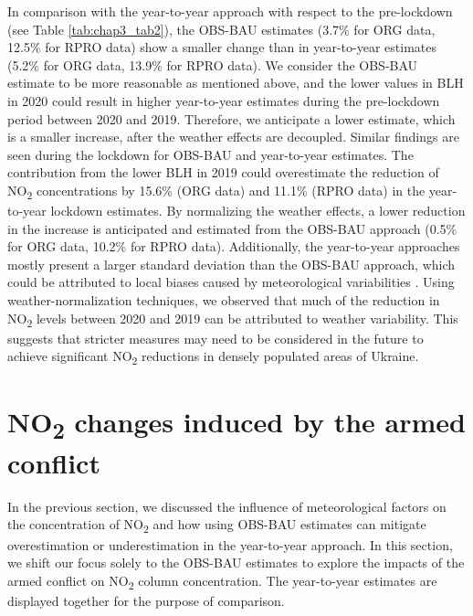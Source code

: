 In comparison with the year-to-year approach with respect to the pre-lockdown (see Table \ref{tab:chap3_tab2}), the OBS-BAU estimates (3.7\% for ORG data, 12.5\% for RPRO data) show a smaller change than in year-to-year estimates (5.2\% for ORG data, 13.9\% for RPRO data). We consider the OBS-BAU estimate to be more reasonable as mentioned above, and the lower values in BLH in 2020 could result in higher year-to-year estimates during the pre-lockdown period between 2020 and 2019. Therefore, we anticipate a lower estimate, which is a smaller increase, after the weather effects are decoupled. Similar findings are seen during the lockdown for OBS-BAU and year-to-year estimates. The contribution from the lower BLH in 2019 could overestimate the reduction of NO\textsubscript{2} concentrations by 15.6\% (ORG data) and 11.1\% (RPRO data) in the year-to-year lockdown estimates. By normalizing the weather effects, a lower reduction in the increase is anticipated and estimated from the OBS-BAU approach (0.5\% for ORG data, 10.2\% for RPRO data). Additionally, the year-to-year approaches mostly present a larger standard deviation than the OBS-BAU approach, which could be attributed to local biases caused by meteorological variabilities \citep{barre2021estimating}. Using weather-normalization techniques, we observed that much of the reduction in NO\textsubscript{2} levels between 2020 and 2019 can be attributed to weather variability. This suggests that stricter measures may need to be considered in the future to achieve significant NO\textsubscript{2} reductions in densely populated areas of Ukraine.\par

\section{NO\textsubscript{2} changes induced by the armed conflict} \label{chap3_war}
In the previous section, we discussed the influence of meteorological factors on the concentration of NO\textsubscript{2} and how using OBS-BAU estimates can mitigate overestimation or underestimation in the year-to-year approach. In this section, we shift our focus solely to the OBS-BAU estimates to explore the impacts of the armed conflict on NO\textsubscript{2} column concentration. The year-to-year estimates are displayed together for the purpose of comparison.\par

